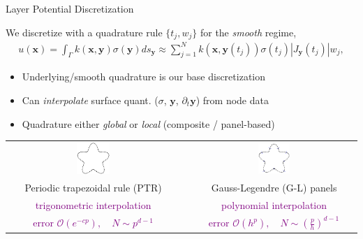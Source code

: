 \documentclass[t]{beamer}
\newcommand{\mbf}[1]{{\bm #1}}           %
\newcommand{\com}[1]{{\scriptsize \textcolor{purple}{#1}}}      %
\newcommand{\xx}{\mbf{x}}
\newcommand{\yy}{\mbf{y}}
\begin{document}
\begin{noframe}{Layer Potential Discretization}
  
  We discretize with a quadrature rule $\{t_j, w_j\}$ for the \emph{smooth} regime,
  \begin{align}
    u(\xx) = 
    \int_\Gamma k(\xx, \yy) \sigma(\yy) ds_\yy
    \approx
    \sum_{j=1}^N k\left(\xx, \yy(t_j)\right) \sigma(t_j) |J_\yy(t_j)| w_j, 
  \end{align}

  \pause
  \begin{itemize}
  \item Underlying/smooth quadrature is our base discretization
  \item Can \emph{interpolate} surface quant. ($\sigma$, $\yy$, $\partial_t\yy$) from node data
    \pause
  \item Quadrature either \emph{global} or \emph{local} (composite / panel-based)
  \end{itemize}
  \begin{center}
    \begin{tabular}{ccc}
      \includegraphics[width=0.2\textwidth]{fig/starfish_trapz} &
                                                                  \hspace{3em}
      &
        \includegraphics[width=0.2\textwidth]{fig/starfish_panels}\\
      Periodic trapezoidal rule (PTR) & & Gauss-Legendre (G-L) panels \\
      \com{trigonometric interpolation} & & \com{polynomial interpolation} \\
      \com{error $\mathcal O(e^{-cp}), \quad N\sim p^{d-1}$} &
      &
        \com{error $\mathcal O(h^p), \quad N \sim \left(\frac{p}{h}\right)^{d-1}$} \\                                            
    \end{tabular}
  \end{center}
\end{noframe}
  
\end{document}
